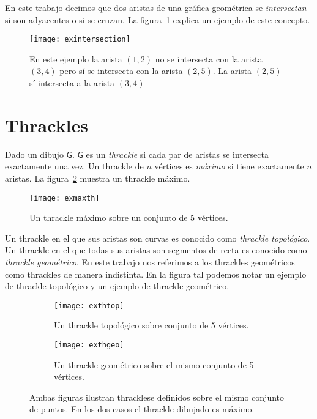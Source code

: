 En este trabajo decimos que dos aristas de una gráfica geométrica se \emph{intersectan}
si son adyacentes o si se cruzan. La figura~\ref{fig:exintersection} explica un ejemplo de este concepto.
\begin{figure}[htpb]
  \centering
  \texttt{[image: exintersection]}
  \caption{En este ejemplo la arista $(1,2)$ no se intersecta con la arista $(3,4)$
  pero sí se intersecta con la arista $(2,5)$. La arista $(2,5)$ sí intersecta a la arista
  $(3,4)$}
  \label{fig:exintersection}
\end{figure}

\section{Thrackles}
Dado un dibujo $\mathsf{G}$. $\mathsf{G}$ es un \emph{thrackle} si cada par de aristas
se intersecta exactamente una vez. Un thrackle de $n$ vértices
es \emph{máximo} si tiene exactamente $n$ aristas. La figura~\ref{fig:exmaxth} muestra un
thrackle máximo.

\begin{figure}[htpb]
  \centering
  \texttt{[image: exmaxth]}
  \caption{Un thrackle máximo sobre un conjunto de 5 vértices.}
  \label{fig:exmaxth}
\end{figure}

Un thrackle en el que sus aristas son curvas es conocido como \emph{thrackle topológico}.
Un thrackle en el que todas sus aristas son segmentos de recta es conocido como
\emph{thrackle geométrico}. En este trabajo nos referimos a los thrackles geométricos
como thrackles de manera indistinta. En la figura tal podemos notar un ejemplo de thrackle
topológico y un ejemplo de thrackle geométrico.

\begin{figure}[htb]
  \centering
\begin{subfigure}[h]{.4\textwidth}
  \centering
  \texttt{[image: exthtop]}
  \caption{Un thrackle topológico sobre conjunto de 5 vértices.}
  \label{fig:exthtop}
\end{subfigure}\hfill%
\begin{subfigure}[h]{.4\textwidth}
  \centering
  \texttt{[image: exthgeo]}
  \caption{Un thrackle geométrico sobre el mismo conjunto de 5 vértices.}
  \label{fig:exthgeo}
\end{subfigure}
\caption{Ambas figuras ilustran thracklese definidos sobre el mismo conjunto de
puntos. En los dos casos el thrackle dibujado es máximo.}
\label{fig:exthgeotop}
\end{figure}

